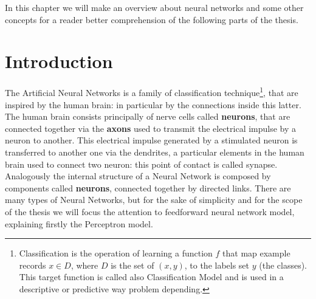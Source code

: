 \label{chap:ann}
In this chapter we will make an overview about neural networks and some other concepts for a reader better comprehension of the following parts of the thesis.

\section{Introduction}
The Artificial Neural Networks is a family of classification technique\footnote{Classification is the operation of learning a function \textbf{$f$} that map example records \textbf{$x \in D$}, where $D$ is the set of \textbf{$(x, y)$}, to the labels set \textbf{$y$} (the classes). This target function is called also Classification Model and is used in a descriptive or predictive way problem depending.}, that are inspired by the human brain: in particular by the connections inside this latter. The human brain consists principally of nerve cells called \textbf{neurons}, that are connected together via the \textbf{axons} used to transmit the electrical impulse by a neuron to another. This electrical impulse generated by a stimulated neuron is transferred to another one via the dendrites, a particular elements in the human brain used to connect two neuron: this point of contact is called synapse. \newline\newline
Analogously the internal structure of a Neural Network is composed by components called \textbf{neurons}, connected together by directed links. There are many types of Neural Networks, but for the sake of simplicity and  for the scope of the thesis we will focus the attention to feedforward neural network model, explaining firstly the Perceptron model.

